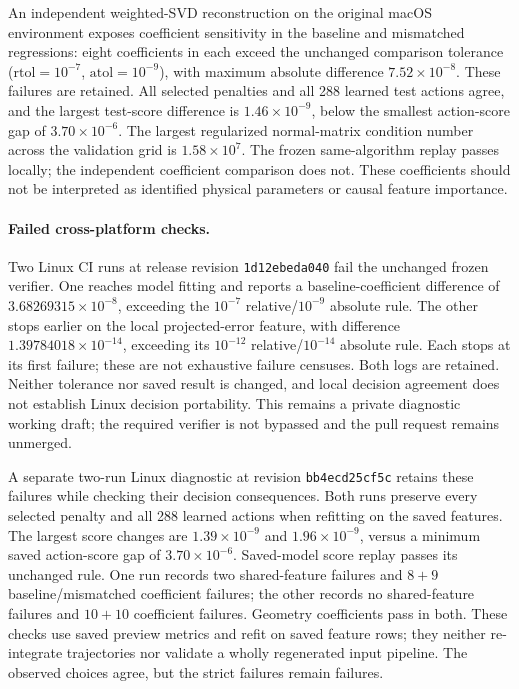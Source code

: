 

An independent weighted-SVD reconstruction on the original macOS environment exposes coefficient sensitivity in the baseline and mismatched regressions: eight coefficients in each exceed the unchanged comparison tolerance ($\mathrm{rtol}=10^{-7}$, $\mathrm{atol}=10^{-9}$), with maximum absolute difference $7.52\times10^{-8}$. These failures are retained. All selected penalties and all 288 learned test actions agree, and the largest test-score difference is $1.46\times10^{-9}$, below the smallest action-score gap of $3.70\times10^{-6}$. The largest regularized normal-matrix condition number across the validation grid is $1.58\times10^7$. The frozen same-algorithm replay passes locally; the independent coefficient comparison does not. These coefficients should not be interpreted as identified physical parameters or causal feature importance.

\paragraph{Failed cross-platform checks.} Two Linux CI runs at release revision \texttt{1d12ebeda040} fail the unchanged frozen verifier. One reaches model fitting and reports a baseline-coefficient difference of $3.68269315\times10^{-8}$, exceeding the $10^{-7}$ relative/$10^{-9}$ absolute rule. The other stops earlier on the local projected-error feature, with difference $1.39784018\times10^{-14}$, exceeding its $10^{-12}$ relative/$10^{-14}$ absolute rule. Each stops at its first failure; these are not exhaustive failure censuses. Both logs are retained. Neither tolerance nor saved result is changed, and local decision agreement does not establish Linux decision portability. This remains a private diagnostic working draft; the required verifier is not bypassed and the pull request remains unmerged.

A separate two-run Linux diagnostic at revision \texttt{bb4ecd25cf5c} retains these failures while checking their decision consequences. Both runs preserve every selected penalty and all 288 learned actions when refitting on the saved features. The largest score changes are $1.39\times10^{-9}$ and $1.96\times10^{-9}$, versus a minimum saved action-score gap of $3.70\times10^{-6}$. Saved-model score replay passes its unchanged rule. One run records two shared-feature failures and $8+9$ baseline/mismatched coefficient failures; the other records no shared-feature failures and $10+10$ coefficient failures. Geometry coefficients pass in both. These checks use saved preview metrics and refit on saved feature rows; they neither re-integrate trajectories nor validate a wholly regenerated input pipeline. The observed choices agree, but the strict failures remain failures.

